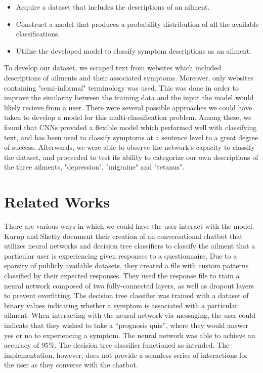 \documentclass[12pt]{report}
\begin{document}
\begin{itemize}
	\item Acquire a dataset that includes the descriptions of an ailment.
	\item Construct a model that produces a probability distribution of all the available classifications.
	\item Utilize the developed model to classify symptom descriptions as an ailment.
\end{itemize}

To develop our dataset, we scraped text from websites which included
descriptions of ailments and their associated symptoms. Moreover, only websites
containing "semi-informal" terminology was used. This was done in order to
improve the similarity between the training data and the input the model would
likely recieve from a user. There were several possible approaches we could have
taken to develop a model for this multi-classification problem.
Among these, we found that CNNs
provided a flexible model which performed well with classifying text, and has been
used to classify symptoms at a sentence level to a great degree
of success\cite{HughesLKS17}. Afterwards, we were able to observe the network's capacity to classify
the dataset, and proceeded to test its ability to categorize our
own descriptions of the three ailments, "depression", "migraine" and "tetanus".

\chapter{Related Works}
There are various ways in which we could have the user interact with the
model. Kurup and Shetty document their creation of an conversational chatbot
that utilizes neural networks and decision tree classifiers to classify the
ailment that a particular user is experiencing given responses to a
questionnaire. Due to a sparsity of publicly available
datasets, they created a file with custom patterns classified by their
expected responses. They used the response file to train a neural network composed of two
fully-connected layers, as well as dropout layers to prevent overfitting. The decision
tree classifier was trained with a dataset of binary values indicating
whether a symptom is associated with a particular ailment. When
interacting with the neural network via messaging, the user could indicate
that they wished to take a “prognosis quiz”, where they would answer yes or
no to experiencing a symptom. The neural network was able to achieve
an accuracy of 95\%. The decision tree classifier functioned as intended. The
implementation, however, does not provide a seamless series of interactions
for the user as they converse with the chatbot\cite{kurup_2021}.
\end{document}
